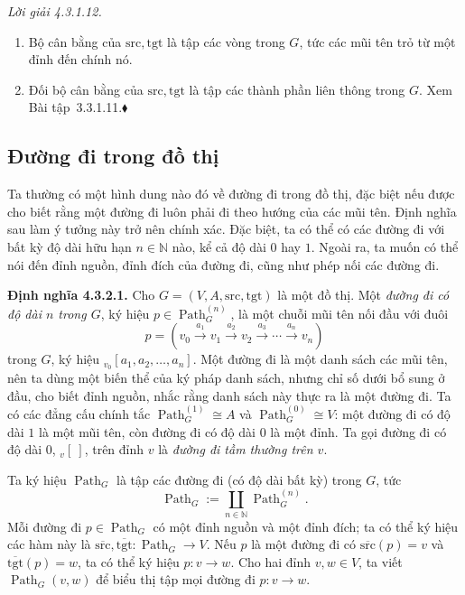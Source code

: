 \noindent\textit{Lời giải 4.3.1.12.}\keepwithnext
\begin{enumerate}[label=\alph*.]
\item Bộ cân bằng của $\mathrm{src},\mathrm{tgt}$ là tập các vòng trong $G$, tức các mũi tên trỏ từ một đỉnh đến chính nó.
\item Đối bộ cân bằng của $\mathrm{src},\mathrm{tgt}$ là tập các thành phần liên thông trong $G$. Xem Bài tập~3.3.1.11.\nobreak\hfill$\blacklozenge$
\end{enumerate}

\subsection{Đường đi trong đồ thị}

Ta thường có một hình dung nào đó về đường đi trong đồ thị, đặc biệt nếu được cho biết rằng một đường đi luôn phải đi theo hướng của các mũi tên. Định nghĩa sau làm ý tưởng này trở nên chính xác. Đặc biệt, ta có thể có các đường đi với bất kỳ độ dài hữu hạn $n\in\mathbb{N}$ nào, kể cả độ dài $0$ hay $1$. Ngoài ra, ta muốn có thể nói đến đỉnh nguồn, đỉnh đích của đường đi, cũng như phép nối các đường đi.

\noindent\textbf{Định nghĩa 4.3.2.1.} Cho $G=(V,A,\mathrm{src},\mathrm{tgt})$ là một đồ thị. Một \emph{đường đi có độ dài $n$ trong $G$}, ký hiệu $p\in\operatorname{Path}_G^{(n)}$, là một chuỗi mũi tên nối đầu với đuôi
\begin{equation}
p=(v_0\xrightarrow{a_1}v_1\xrightarrow{a_2}v_2\xrightarrow{a_3}\cdots\xrightarrow{a_n}v_n)
\tag{4.5}
\end{equation}
trong $G$, ký hiệu ${}_{v_0}[a_1,a_2,\ldots,a_n]$. Một đường đi là một danh sách các mũi tên, nên ta dùng một biến thể của ký pháp danh sách, nhưng chỉ số dưới bổ sung ở đầu, cho biết đỉnh nguồn, nhắc rằng danh sách này thực ra là một đường đi. Ta có các đẳng cấu chính tắc $\operatorname{Path}_G^{(1)}\cong A$ và $\operatorname{Path}_G^{(0)}\cong V$: một đường đi có độ dài $1$ là một mũi tên, còn đường đi có độ dài $0$ là một đỉnh. Ta gọi đường đi có độ dài $0$, ${}_v[\ ]$, trên đỉnh $v$ là \emph{đường đi tầm thường trên $v$}.

Ta ký hiệu $\operatorname{Path}_G$ là tập các đường đi (có độ dài bất kỳ) trong $G$, tức
\[
\operatorname{Path}_G:=\coprod_{n\in\mathbb{N}}\operatorname{Path}_G^{(n)}.
\]
Mỗi đường đi $p\in\operatorname{Path}_G$ có một đỉnh nguồn và một đỉnh đích; ta có thể ký hiệu các hàm này là $\overline{\mathrm{src}},\overline{\mathrm{tgt}}:\operatorname{Path}_G\to V$. Nếu $p$ là một đường đi có $\overline{\mathrm{src}}(p)=v$ và $\overline{\mathrm{tgt}}(p)=w$, ta có thể ký hiệu $p:v\to w$. Cho hai đỉnh $v,w\in V$, ta viết $\operatorname{Path}_G(v,w)$ để biểu thị tập mọi đường đi $p:v\to w$.

